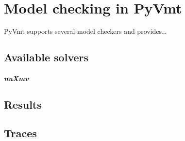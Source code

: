 \chapter{Model checking in PyVmt}
PyVmt supports several model checkers and provides\dots %


\section{Available solvers}

\paragraph{nuXmv}

\section{Results}

\section{Traces}

